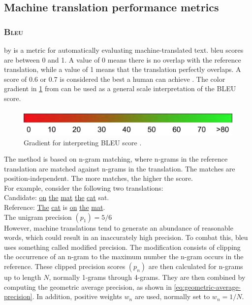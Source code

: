 \subsection{Machine translation performance metrics}
\label{sec:machine-translation-metrics}

\subsubsection{\textsc{Bleu}}
\label{sec:blue-score}
 by \textcite{papineni2002bleu} is a metric for automatically evaluating machine-translated text. \acrshort{bleu} scores are between 0 and 1. A value of 0 means there is no overlap with the reference translation, while a value of 1 means that the translation perfectly overlaps. A score of 0.6 or 0.7 is considered the best a human can achieve \cite{googlebleu,papineni2002bleu}. The color gradient in \cref{fig:bleu} from \cite{lavie2011evaluating} can be used as a general scale interpretation of the BLEU score.

\begin{figure}
    \centering
    \includegraphics[width=\textwidth,keepaspectratio]{figures/bleu_score_range.png}
    \caption{Gradient for interpreting BLEU score \textcite{lavie2011evaluating}.}
    \label{fig:bleu}
\end{figure}
The method is based on n-gram matching, where n-grams in the reference translation are matched against n-grams in the translation. The matches are position-independent. The more matches, the higher the score.\\

\noindent For example, consider the following two translations:\\

\indent Candidate: \underline{on} \underline{the} \underline{mat} \underline{the} \underline{cat} sat.\\
\indent Reference: \underline{The} \underline{cat} is \underline{on} \underline{the} \underline{mat}.\\

\noindent The unigram precision \(\left(p_1\right) = 5/6\)\\

\noindent However, machine translations tend to generate an abundance of reasonable words, which could result in an inaccurately high precision. To combat this, \acrshort{bleu} uses something called modified precision. The modification consists of clipping the occurrence of an n-gram to the maximum number the n-gram occurs in the reference. These clipped precision scores \(\left(p_n\right)\) are then calculated for n-grams up to length \(N\), normally 1-grams through 4-grams. They are then combined by computing the geometric average precision, as shown in \cref{eq:geometric-average-precision}. In addition, positive weights \(w_n\) are used, normally set to \(w_n = 1/N\).

